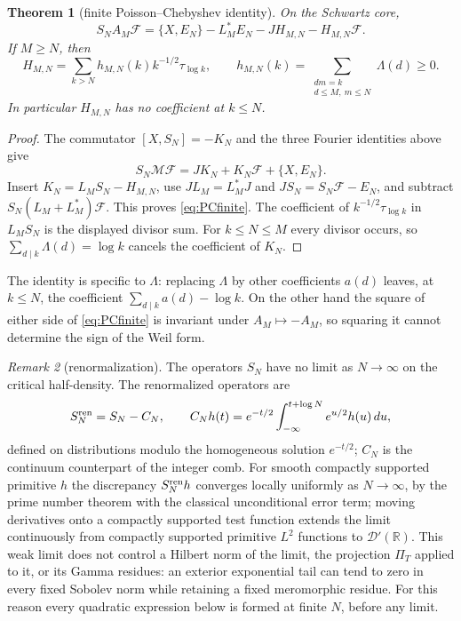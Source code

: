\documentclass[11pt]{amsart}
\newtheorem{theorem}{Theorem}[section]
\theoremstyle{definition}
\theoremstyle{remark}
\newtheorem{remark}[theorem]{Remark}
\newcommand{\R}{\mathbb R}
\newcommand{\PiT}{\Pi_T}
\begin{document}
\begin{theorem}[finite Poisson--Chebyshev identity]\label{thm:PCfinite}
On the Schwartz core,
\begin{equation}\label{eq:PCfinite}
 S_NA_M\mathscr F
 =\{X,E_N\}-L_M^*E_N-JH_{M,N}-H_{M,N}\mathscr F.
\end{equation}
If $M\ge N$, then
\[
 H_{M,N}=\sum_{k>N}h_{M,N}(k)k^{-1/2}\tau_{\log k},\qquad
 h_{M,N}(k)=\sum_{\substack{dm=k\\d\le M,\ m\le N}}\Lambda(d)\ge0.
\]
In particular $H_{M,N}$ has no coefficient at $k\le N$.
\end{theorem}
\begin{proof}
The commutator $[X,S_N]=-K_N$ and the three Fourier identities above give
\[
 S_N\mathcal M\mathscr F=JK_N+K_N\mathscr F+\{X,E_N\}.
\]
Insert $K_N=L_MS_N-H_{M,N}$, use $JL_M=L_M^*J$ and
$JS_N=S_N\mathscr F-E_N$, and subtract $S_N(L_M+L_M^*)\mathscr F$.
This proves \eqref{eq:PCfinite}. The coefficient of
$k^{-1/2}\tau_{\log k}$ in $L_MS_N$ is the displayed divisor sum. For
$k\le N\le M$ every divisor occurs, so $\sum_{d\mid k}\Lambda(d)=\log k$ cancels the
coefficient of $K_N$.
\end{proof}

The identity is specific to $\Lambda$: replacing $\Lambda$ by other coefficients $a(d)$ leaves, at
$k\le N$, the coefficient $\sum_{d\mid k}a(d)-\log k$. On the other hand the square of either side
of \eqref{eq:PCfinite} is invariant under $A_M\mapsto-A_M$, so squaring it cannot determine the sign
of the Weil form.

\begin{remark}[renormalization]\label{rem:Sren}
The operators $S_N$ have no limit as $N\to\infty$ on the critical half-density. The renormalized
operators are
\[
 S_N^{\rm ren}=S_N-C_N,\qquad
 C_Nh(t)=e^{-t/2}\int_{-\infty}^{t+\log N}e^{u/2}h(u)\,du ,
\]
defined on distributions modulo the homogeneous solution $e^{-t/2}$; $C_N$ is the continuum
counterpart of the integer comb. For smooth compactly supported primitive $h$ the discrepancy
$S_N^{\rm ren}h$ converges locally uniformly as $N\to\infty$, by the prime number theorem with
the classical unconditional error term; moving derivatives onto a compactly supported test
function extends the limit continuously from compactly supported primitive $L^2$ functions to
$\mathcal D'(\R)$. This weak limit does not control a Hilbert norm of the limit, the projection
$\PiT$ applied to it, or its Gamma residues: an exterior exponential tail can tend to zero in every
fixed Sobolev norm while retaining a fixed meromorphic residue. For this reason every quadratic
expression below is formed at finite $N$, before any limit.
\end{remark}
\end{document}
